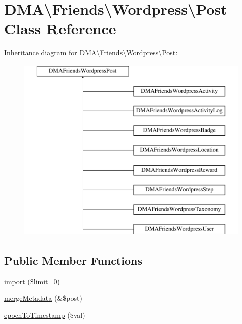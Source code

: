 \hypertarget{classDMA_1_1Friends_1_1Wordpress_1_1Post}{}\section{D\+M\+A\textbackslash{}Friends\textbackslash{}Wordpress\textbackslash{}Post Class Reference}
\label{classDMA_1_1Friends_1_1Wordpress_1_1Post}
Inheritance diagram for D\+M\+A\textbackslash{}Friends\textbackslash{}Wordpress\textbackslash{}Post\+:\begin{figure}[H]
\begin{center}
\leavevmode
\includegraphics[height=9.000000cm]{d2/de2/classDMA_1_1Friends_1_1Wordpress_1_1Post}
\end{center}
\end{figure}
\subsection*{Public Member Functions}
\begin{DoxyCompactItemize}
\item 
\hyperlink{classDMA_1_1Friends_1_1Wordpress_1_1Post_a4eb2c6b3e89a43b3221e9e2564059510}{import} (\$limit=0)
\item 
\hyperlink{classDMA_1_1Friends_1_1Wordpress_1_1Post_adb1c6652d06b360d1f81d14dde95b5b1}{merge\+Metadata} (\&\$post)
\item 
\hyperlink{classDMA_1_1Friends_1_1Wordpress_1_1Post_af6960d9c63c4224f6f481c88d2b5d076}{epoch\+To\+Timestamp} (\$val)
\end{DoxyCompactItemize}
